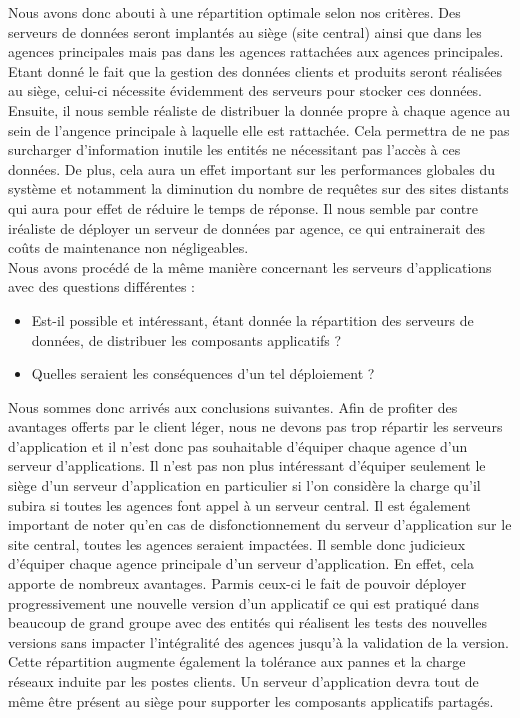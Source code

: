 Nous avons donc abouti à une répartition optimale selon nos critères. Des serveurs de données seront implantés au siège (site central) ainsi que dans les agences principales mais pas dans les agences rattachées aux agences principales. Etant donné le fait que la gestion des données clients et produits seront réalisées au siège, celui-ci nécessite évidemment des serveurs pour stocker ces données. Ensuite, il nous semble réaliste de distribuer la donnée propre à chaque agence au sein de l'angence principale à laquelle elle est rattachée. Cela permettra de ne pas surcharger d'information inutile les entités ne nécessitant pas l'accès à ces données. De plus, cela aura un effet important sur les performances globales du système et notamment la diminution du nombre de requêtes sur des sites distants qui aura pour effet de réduire le temps de réponse. Il nous semble par contre iréaliste de déployer un serveur de données par agence, ce qui entrainerait des coûts de maintenance non négligeables.\\

Nous avons procédé de la même manière concernant les serveurs d'applications avec des questions différentes :\\
\begin{itemize}
	\item[\textbullet] Est-il possible et intéressant, étant donnée la répartition des serveurs de données, de distribuer les composants applicatifs ?
	\item[\textbullet] Quelles seraient les conséquences d'un tel déploiement ?\\
\end{itemize}

Nous sommes donc arrivés aux conclusions suivantes. Afin de profiter des avantages offerts par le client léger, nous ne devons pas trop répartir les serveurs d'application et il n'est donc pas souhaitable d'équiper chaque agence d'un serveur d'applications. Il n'est pas non plus intéressant d'équiper seulement le siège d'un serveur d'application en particulier si l'on considère la charge qu'il subira si toutes les agences font appel à un serveur central. Il est également important de noter qu'en cas de disfonctionnement du serveur d'application sur le site central, toutes les agences seraient impactées. Il semble donc judicieux d'équiper chaque agence principale d'un serveur d'application. En effet, cela apporte de nombreux avantages. Parmis ceux-ci le fait de pouvoir déployer progressivement une nouvelle version d'un applicatif ce qui est pratiqué dans beaucoup de grand groupe avec des entités qui réalisent les tests des nouvelles versions sans impacter l'intégralité des agences jusqu'à la validation de la version. Cette répartition augmente également la tolérance aux pannes et la charge réseaux induite par les postes clients. Un serveur d'application devra tout de même être présent au siège pour supporter les composants applicatifs partagés.\\

